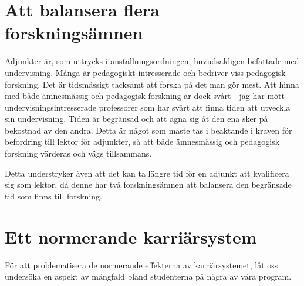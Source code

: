 \documentclass[a4paper,oneside,article,swedish]{memoir}
\let\section\chapter
\begin{document}
\section{Att balansera flera forskningsämnen}

Adjunkter är, som uttrycks i
anställningsordningen\autocite[avsnitt 1.5, ss.~20]{Anställningsordning},
huvudsakligen befattade med undervisning.
Många är pedagogiskt intresserade och bedriver viss pedagogisk forskning.
Det är tidsmässigt tacksamt att forska på det man gör mest.
Att hinna med både ämnesmässig och pedagogisk forskning är dock svårt---jag har 
mött undervisningsintresserade professorer som har svårt att finna tiden att 
utveckla sin undervisning.
Tiden är begränsad och att ägna sig åt den ena sker på bekostnad av den andra.
Detta är något som måste tas i beaktande i kraven för befordring till lektor 
för adjunkter, så att både ämnesmässig och pedagogisk forskning värderas och 
vägs tillsammans.

Detta understryker även att det kan ta längre tid för en adjunkt att 
kvalificera sig som lektor, då denne har två forskningsämnen att balansera den 
begränsade tid som finns till forskning.


\section{Ett normerande karriärsystem}\label{NormerandeKarriärsystem}

För att problematisera de normerande effekterna av karriärsystemet, låt oss 
undersöka en aspekt av mångfald bland studenterna på några av våra program.
\end{document}
